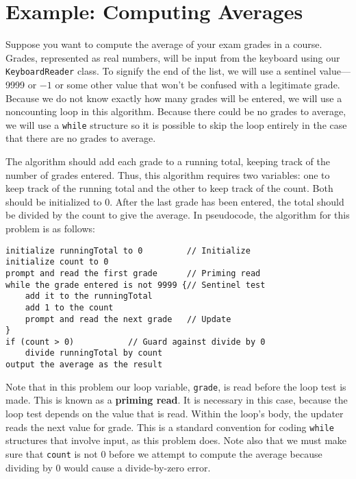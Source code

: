 \section{Example: Computing Averages}
\label{example-computing-averages}
\noindent Suppose you want to compute the average of your exam grades in a
  course.  Grades,
represented as real numbers, will be input from the keyboard using our
{\tt KeyboardReader} class. To signify the end of the list, we will
use a sentinel value---9999 or $-1$ or some other value that won't be
confused with a legitimate grade. Because we do not know exactly how
many grades will be entered, we will use a noncounting loop in this
algorithm. Because there could be no grades to average, we will use a
{\tt while} structure so it is possible to skip the loop entirely in
the case that there are no grades to average.

The algorithm should add each grade to a running total, keeping track
of the number of grades entered. Thus, this algorithm requires two
variables: one to keep track of the running total and the other to
keep track of the count. Both should be initialized to 0.  After the
last grade has been entered, the total should be divided by the count
to give the average.  In pseudocode, the algorithm for this problem is
as follows:

\begin{jjjlisting}
\begin{lstlisting}
initialize runningTotal to 0         // Initialize
initialize count to 0
prompt and read the first grade      // Priming read
while the grade entered is not 9999 {// Sentinel test
    add it to the runningTotal
    add 1 to the count
    prompt and read the next grade   // Update
}
if (count > 0)           // Guard against divide by 0
    divide runningTotal by count
output the average as the result
\end{lstlisting}
\end{jjjlisting}

\noindent Note that in this problem our loop variable, {\tt grade},
 is read before the loop test is made. This
is known as a {\bf priming read}. It is necessary in this case,
because the loop test depends on the value that is read.  Within the
loop's body, the updater reads the next value for grade. This is a
standard convention for coding {\tt while} structures that involve
input, as this problem does. Note also that we must make sure that
{\tt count} is not 0 before we attempt to compute the
average because dividing by 0 would cause a divide-by-zero error.

